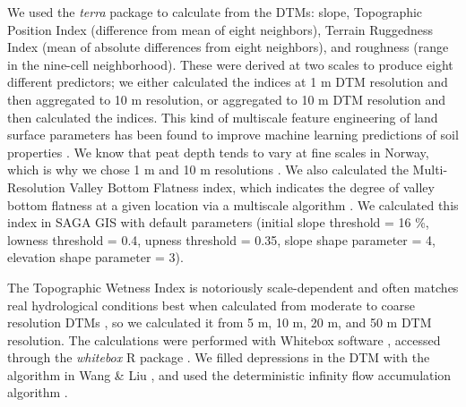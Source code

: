 \documentclass[soil, manuscript]{copernicus}
\begin{document}
We used the \emph{terra} package to calculate from the DTMs: slope, Topographic Position Index (difference from mean of eight neighbors), Terrain Ruggedness Index (mean of absolute differences from eight neighbors), and roughness (range in the nine-cell neighborhood).
These were derived at two scales to produce eight different predictors; we either calculated the indices at 1 m DTM resolution and then aggregated to 10 m resolution, or aggregated to 10 m DTM resolution and then calculated the indices.
This kind of multiscale feature engineering of land surface parameters has been found to improve machine learning predictions of soil properties \citep{millerImpactMultiscalePredictor2015, dornikOptimalScalingPredictors2022, newmanAssessingSpatiallyHeterogeneous2023}.
We know that peat depth tends to vary at fine scales in Norway, which is why we chose 1 m and 10 m resolutions \citep{maxwellLandsurfaceParametersSpatial2022}.
We also calculated the Multi-Resolution Valley Bottom Flatness index, which indicates the degree of valley bottom flatness at a given location via a multiscale algorithm \citep{gallantMultiresolutionIndexValley2003}.
We calculated this index in SAGA GIS \citep[v.9.3.2, Morphometry library,][]{conradSystemAutomatedGeoscientific2015} with default parameters (initial slope threshold = 16 \%, lowness threshold = 0.4, upness threshold = 0.35, slope shape parameter = 4, elevation shape parameter = 3).

The Topographic Wetness Index \citep{quinnPredictionHillslopeFlow1991} is notoriously scale-dependent and often matches real hydrological conditions best when calculated from moderate to coarse resolution DTMs \citep{agrenEvaluatingDigitalTerrain2014, riihimakiTopographicWetnessIndex2021}, so we calculated it from 5 m, 10 m, 20 m, and 50 m DTM resolution.
The calculations were performed with Whitebox software \citep{lindsayWhiteboxGATCase2016}, accessed through the \emph{whitebox} R package \citep[v2.4,][]{wuWhiteboxWhiteboxToolsFrontend2022}.
We filled depressions in the DTM with the algorithm in Wang \& Liu \citeyearpar{wangEfficientMethodIdentifying2006}, and used the deterministic infinity flow accumulation algorithm \citep{tarbotonNewMethodDetermination1997}.
\end{document}
